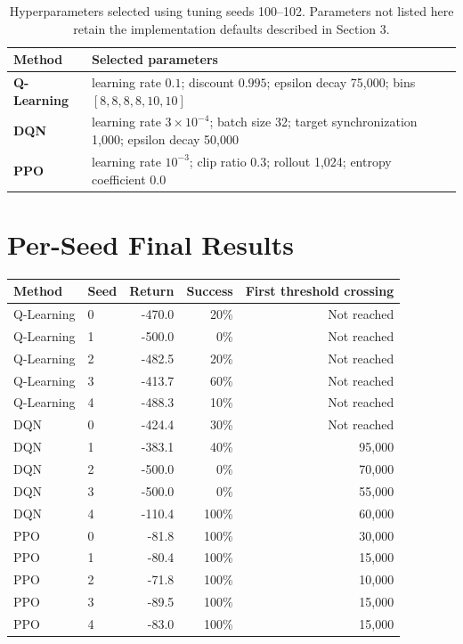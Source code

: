 \documentclass[11pt]{article}
\begin{document}
\begin{table}[htbp]
\centering
\caption{Hyperparameters selected using tuning seeds 100--102. Parameters not
listed here retain the implementation defaults described in Section 3.}
\label{tab:hyperparameters}
\small
\begin{tabularx}{\textwidth}{>{\bfseries}lX}
\toprule
Method & Selected parameters \\
\midrule
Q-Learning & learning rate $0.1$; discount $0.995$; epsilon decay 75,000;
bins $[8,8,8,8,10,10]$ \\
DQN & learning rate $3\times10^{-4}$; batch size 32; target synchronization
1,000; epsilon decay 50,000 \\
PPO & learning rate $10^{-3}$; clip ratio $0.3$; rollout 1,024; entropy
coefficient $0.0$ \\
\bottomrule
\end{tabularx}
\end{table}

\clearpage
\section{Per-Seed Final Results}

\begin{center}
\captionsetup{hypcap=false}
\label{tab:perseed}
\centering
\small
\begin{tabular}{llrrr}
\toprule
Method & Seed & Return & Success & First threshold crossing \\
\midrule
Q-Learning & 0 & -470.0 & 20\% & Not reached \\
Q-Learning & 1 & -500.0 & 0\% & Not reached \\
Q-Learning & 2 & -482.5 & 20\% & Not reached \\
Q-Learning & 3 & -413.7 & 60\% & Not reached \\
Q-Learning & 4 & -488.3 & 10\% & Not reached \\
\midrule
DQN & 0 & -424.4 & 30\% & Not reached \\
DQN & 1 & -383.1 & 40\% & 95,000 \\
DQN & 2 & -500.0 & 0\% & 70,000 \\
DQN & 3 & -500.0 & 0\% & 55,000 \\
DQN & 4 & -110.4 & 100\% & 60,000 \\
\midrule
PPO & 0 & -81.8 & 100\% & 30,000 \\
PPO & 1 & -80.4 & 100\% & 15,000 \\
PPO & 2 & -71.8 & 100\% & 10,000 \\
PPO & 3 & -89.5 & 100\% & 15,000 \\
PPO & 4 & -83.0 & 100\% & 15,000 \\
\bottomrule
\end{tabular}
\end{center}
\end{document}
